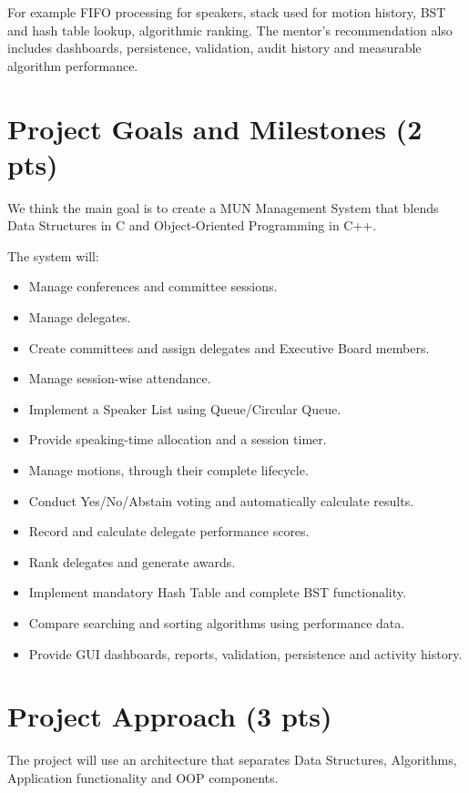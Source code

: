 \documentclass[11pt,a4paper]{article}
\newcommand{\sectiontitle}[1]{\vspace{3pt}\section*{#1}\vspace{2pt}}
\begin{document}
For example FIFO processing for speakers, stack used for motion history, BST and hash table lookup,
algorithmic ranking. The mentor's recommendation also includes dashboards, persistence, validation,
audit history and measurable algorithm performance.

\newpage

\sectiontitle{Project Goals and Milestones (2 pts)}

We think the main goal is to create a MUN Management System that blends Data Structures in C and
Object-Oriented Programming in C++.

The system will:
\begin{itemize}[leftmargin=1.3em,itemsep=3pt]
    \item Manage conferences and committee sessions.
    \item Manage delegates.
    \item Create committees and assign delegates and Executive Board members.
    \item Manage session-wise attendance.
    \item Implement a Speaker List using Queue/Circular Queue.
    \item Provide speaking-time allocation and a session timer.
    \item Manage motions, through their complete lifecycle.
    \item Conduct Yes/No/Abstain voting and automatically calculate results.
    \item Record and calculate delegate performance scores.
    \item Rank delegates and generate awards.
    \item Implement mandatory Hash Table and complete BST functionality.
    \item Compare searching and sorting algorithms using performance data.
    \item Provide GUI dashboards, reports, validation, persistence and activity history.
\end{itemize}

\newpage

\sectiontitle{Project Approach (3 pts)}

The project will use an architecture that separates Data Structures, Algorithms, Application
functionality and OOP components.
\end{document}
